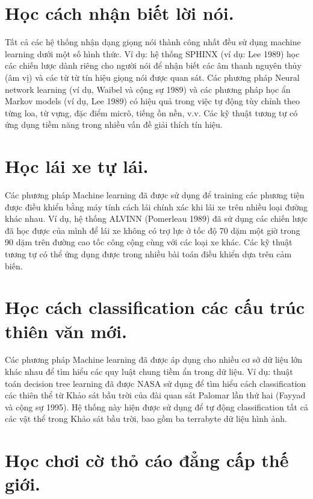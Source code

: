 \section{Học cách nhận biết lời nói.}

Tất cả các hệ thống nhận dạng giọng nói thành công nhất đều sử dụng machine learning dưới một số hình thức. Ví dụ: hệ thống SPHINX (ví dụ: Lee 1989) học các chiến lược dành riêng cho người nói để nhận biết các âm thanh nguyên thủy (âm vị) và các từ từ tín hiệu giọng nói được quan sát. Các phương pháp Neural network learning (ví dụ, Waibel và cộng sự 1989) và các phương pháp học ẩn Markov models (ví dụ, Lee 1989) có hiệu quả trong việc tự động tùy chỉnh theo từng loa, từ vựng, đặc điểm micrô, tiếng ồn nền, v.v. Các kỹ thuật tương tự có ứng dụng tiềm năng trong nhiều vấn đề giải thích tín hiệu.

\section{Học lái xe tự lái.}

Các phương pháp Machine learning đã được sử dụng để training các phương tiện được điều khiển bằng máy tính cách lái chính xác khi lái xe trên nhiều loại đường khác nhau. Ví dụ, hệ thống ALVINN (Pomerleau 1989) đã sử dụng các chiến lược đã học được của mình để lái xe không có trợ lực ở tốc độ 70 dặm một giờ trong 90 dặm trên đường cao tốc công cộng cùng với các loại xe khác. Các kỹ thuật tương tự có thể ứng dụng được trong nhiều bài toán điều khiển dựa trên cảm biến.

\section{Học cách classification các cấu trúc thiên văn mới.}

Các phương pháp Machine learning đã được áp dụng cho nhiều cơ sở dữ liệu lớn khác nhau để tìm hiểu các quy luật chung tiềm ẩn trong dữ liệu. Ví dụ: thuật toán decision tree learning đã được NASA sử dụng để tìm hiểu cách classification các thiên thể từ Khảo sát bầu trời của đài quan sát Palomar lần thứ hai (Fayyad và cộng sự 1995). Hệ thống này hiện được sử dụng để tự động classification tất cả các vật thể trong Khảo sát bầu trời, bao gồm ba terrabyte dữ liệu hình ảnh.

\section{Học chơi cờ thỏ cáo đẳng cấp thế giới.}

